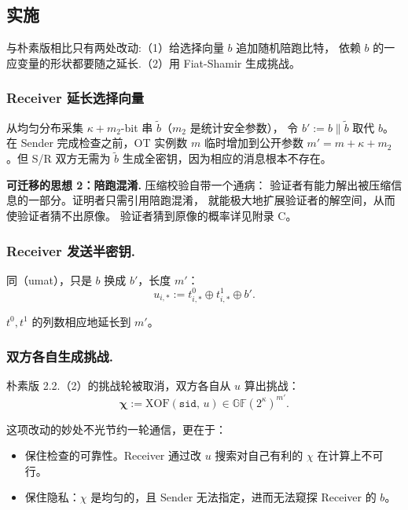 \subsection{实施}

与朴素版相比只有两处改动:（1）给选择向量 $b$ 追加随机陪跑比特，
依赖 $b$ 的一应变量的形状都要随之延长.（2）用 Fiat-Shamir 生成挑战。

\subsubsection{Receiver 延长选择向量}

从均匀分布采集 $\kappa+m_2$-bit 串 $\tilde b$（$m_2$ 是统计安全参数），
令 $b' := b \mathbin{\|} \tilde b$ 取代 $b$。在 Sender 完成检查之前，OT
实例数 $m$ 临时增加到公开参数 $m' = m + \kappa + m_2$。但 S/R
双方无需为 $\tilde b$ 生成全密钥，因为相应的消息根本不存在。

\textbf{可迁移的思想 2：陪跑混淆.} 压缩校验自带一个通病：
验证者有能力解出被压缩信息的一部分。证明者只需引用陪跑混淆，
就能极大地扩展验证者的解空间，从而使验证者猜不出原像。
验证者猜到原像的概率详见附录 C。

\subsubsection{Receiver 发送半密钥.}

同（umat），只是 $b$ 换成 $b'$，长度 $m'$：
\begin{equation}\label{eq:02-kos15:12}
u_{i,*} := t^0_{i,*} \oplus t^1_{i,*} \oplus b'.
\end{equation}

$t^0, t^1$ 的列数相应地延长到 $m'$。

\subsubsection{双方各自生成挑战.}

朴素版 2.2.（2）的挑战轮被取消，双方各自从 $u$ 算出挑战：
\begin{equation}\label{eq:02-kos15:chal-fs}
\boldsymbol{\chi} := \mathrm{XOF}\left(\mathtt{sid},\, u\right)
\in \mathbb{GF}(2^\kappa)^{m'}. \tag{chal-fs}
\end{equation}

这项改动的妙处不光节约一轮通信，更在于：

\begin{itemize}

\item
  保住检查的可靠性。Receiver
  通过改 $u$ 搜索对自己有利的 $\chi$ 在计算上不可行。
\item
  保住隐私：$\chi$ 是均匀的，且 Sender 无法指定，进而无法窥探 Receiver
  的 $b$。
\end{itemize}

